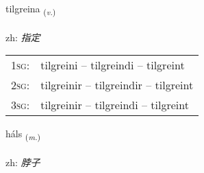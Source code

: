 \documentclass[frontgrid, backgrid]{flacards}\usepackage[]{graphicx}\usepackage[]{color}
\begin{document}
\renewcommand{\flhead}{\vskip5pt \fboxsep=0pt {\small\bfseries\footnotesize Sagnorð | 动词}}
\renewcommand{\fcfoot}{\vskip5pt \fboxsep=0pt \hspace{2pt}{\small\bfseries\footnotesize 2K}}

\renewcommand{\blhead}{\vskip5pt {\small\bfseries\footnotesize Sagnorð | 动词 }}
\renewcommand{\bcfoot}{\vskip5pt \hspace{2pt}{\small\bfseries\footnotesize 2K}}


{tilgreina \small{\textsubscript{(\textit{v.})}} \\[1ex] %
\textphonetic{[tʰɪlkreina]} \\
zh: \emph{指定} \\  [2ex]
\renewcommand*{\arraystretch}{0.8}
\begin{tabular}{p{1cm}l}
\textsc{1sg}: & tilgreini -- tilgreindi -- tilgreint \\ 
\textsc{2sg}: & tilgreinir -- tilgreindir -- tilgreint \\ 
\textsc{3sg}: & tilgreinir -- tilgreindi -- tilgreint \\ 
\end{tabular}
}

\renewcommand{\flhead}{\vskip5pt \fboxsep=0pt {\small\bfseries\footnotesize Nafnorð | 名词}}
\renewcommand{\fcfoot}{\vskip5pt \fboxsep=0pt \hspace{2pt}{\small\bfseries\footnotesize 2K}}

\renewcommand{\blhead}{\vskip5pt {\small\bfseries\footnotesize Nafnorð | 名词 }}
\renewcommand{\bcfoot}{\vskip5pt \hspace{2pt}{\small\bfseries\footnotesize 2K}}


{háls \small{\textsubscript{(\textit{m.})}} \\[1ex] %
\textphonetic{[hauls]} \\
zh: \emph{脖子} \\  [2ex]
\renewcommand*{\arraystretch}{0.8}
}
\end{document}
